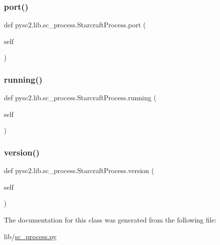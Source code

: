 \subsubsection{\texorpdfstring{port()}{port()}}
{\footnotesize\ttfamily def pysc2.\+lib.\+sc\+\_\+process.\+Starcraft\+Process.\+port (\begin{DoxyParamCaption}\item[{}]{self }\end{DoxyParamCaption})}

\mbox{\label{classpysc2_1_1lib_1_1sc__process_1_1_starcraft_process_a3937176eb8f9c0baf4f18b455fb42243}} 
\subsubsection{\texorpdfstring{running()}{running()}}
{\footnotesize\ttfamily def pysc2.\+lib.\+sc\+\_\+process.\+Starcraft\+Process.\+running (\begin{DoxyParamCaption}\item[{}]{self }\end{DoxyParamCaption})}

\mbox{\label{classpysc2_1_1lib_1_1sc__process_1_1_starcraft_process_afa21c71cb3b5c67ef329b5bd334d3880}} 
\subsubsection{\texorpdfstring{version()}{version()}}
{\footnotesize\ttfamily def pysc2.\+lib.\+sc\+\_\+process.\+Starcraft\+Process.\+version (\begin{DoxyParamCaption}\item[{}]{self }\end{DoxyParamCaption})}



The documentation for this class was generated from the following file\+:\begin{DoxyCompactItemize}
\item 
lib/\mbox{\hyperlink{sc__process_8py}{sc\+\_\+process.\+py}}\end{DoxyCompactItemize}
